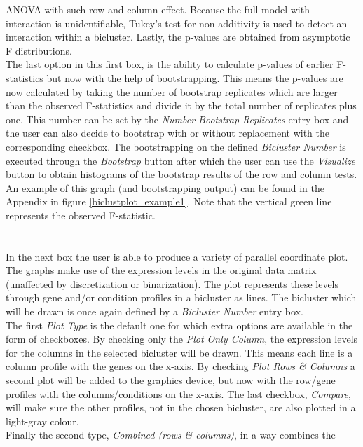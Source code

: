 \documentclass[a4paper]{article}\usepackage[]{graphicx}\usepackage[]{color}
\begin{document}
ANOVA with such row and column effect. Because the full model with interaction
is unidentifiable, Tukey's test for non-additivity is used to detect an
interaction within a bicluster. Lastly, the p-values are obtained from
asymptotic F distributions.\\
The last option in this first box, is the ability to calculate p-values of
earlier F-statistics but now with the help of bootstrapping. This means the
p-values are now calculated by taking the number of bootstrap replicates which
are larger than the observed F-statistics and divide it by the total number of
replicates plus one. This number can be set by the {\it Number Bootstrap
Replicates} entry box and the user can also decide to bootstrap with or without
replacement with the corresponding checkbox. The bootstrapping on the defined
{\it Bicluster Number} is executed through the {\it Bootstrap} button after
which the user can use the {\it Visualize} button to obtain histograms of the
bootstrap results of the row and column tests. An example of this graph (and
bootstrapping output) can be found in the Appendix in figure
\ref{biclustplot_example1}. Note that the vertical green line represents the
observed F-statistic.
\\ \\
\\
\noindent In the next box the user is able to produce a variety of parallel
coordinate plot. The graphs make use of the expression levels in the original
data matrix (unaffected by discretization or binarization). The plot represents
these levels through gene and/or condition profiles in a bicluster as lines.
The bicluster which will be drawn is once again defined by a {\it Bicluster
Number} entry box.\\
The first {\it Plot Type} is the default one for which extra options are
available in the form of checkboxes. By checking only the {\it Plot Only
Column}, the expression levels for the columns in the selected bicluster will be
drawn. This means each line is a column profile with the genes on the x-axis. By
checking {\it Plot Rows \& Columns} a second plot will be added to the graphics
device, but now with the row/gene profiles with the columns/conditions on the
x-axis. The last checkbox, {\it Compare}, will make sure the other profiles, not
in the chosen bicluster, are also plotted in a light-gray colour.\\
Finally the second type, {\it Combined (rows \& columns)}, in a way combines the
\end{document}
